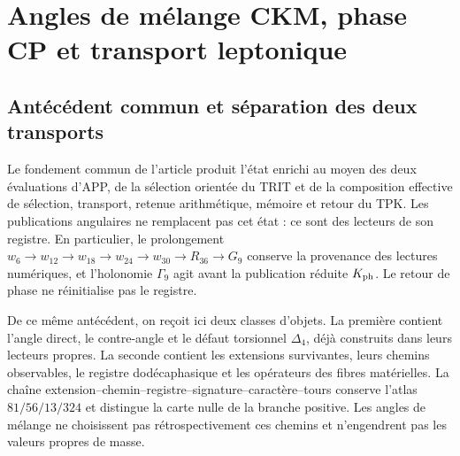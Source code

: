 
\section{Angles de mélange CKM, phase CP et transport leptonique}
\label{ii:sec:ii-propagacion-angular}

\subsection{Antécédent commun et séparation des deux transports}

Le fondement commun de l'article produit l'état enrichi au moyen des
deux évaluations d'APP, de la sélection orientée du TRIT et de la
composition effective de sélection, transport, retenue arithmétique, mémoire et retour
du TPK. Les publications angulaires ne remplacent pas cet état : ce sont des lecteurs
de son registre. En particulier, le prolongement
\(w_6\to w_{12}\to w_{18}\to w_{24}\to w_{30}\to R_{36}\to G_9\)
conserve la provenance des lectures numériques, et l'holonomie
\(\Gamma_9\) agit avant la publication réduite \(K_{\rm ph}\).
Le retour de phase ne réinitialise pas le registre.

De ce même antécédent, on reçoit ici deux classes d'objets. La première
contient l'angle direct, le contre-angle et le défaut torsionnel
\(\Delta_4\), déjà construits dans leurs lecteurs propres. La seconde contient
les extensions survivantes, leurs chemins observables, le registre
dodécaphasique et les opérateurs des fibres matérielles. La chaîne
extension--chemin--registre--signature--caractère--tours conserve l'atlas
\(81/56/13/324\) et distingue la carte nulle de la branche positive.
Les angles de mélange ne choisissent pas rétrospectivement ces chemins et n'engendrent
pas les valeurs propres de masse.


